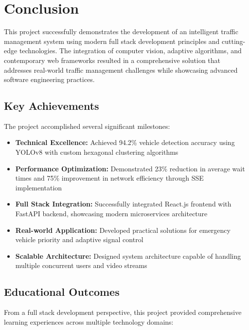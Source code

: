 \documentclass[conference]{IEEEtran}
\begin{document}
\section{Conclusion}

This project successfully demonstrates the development of an intelligent traffic management system using modern full stack development principles and cutting-edge technologies. The integration of computer vision, adaptive algorithms, and contemporary web frameworks resulted in a comprehensive solution that addresses real-world traffic management challenges while showcasing advanced software engineering practices.

\subsection{Key Achievements}

The project accomplished several significant milestones:

\begin{itemize}
\item \textbf{Technical Excellence:} Achieved 94.2\% vehicle detection accuracy using YOLOv8 with custom hexagonal clustering algorithms
\item \textbf{Performance Optimization:} Demonstrated 23\% reduction in average wait times and 75\% improvement in network efficiency through SSE implementation
\item \textbf{Full Stack Integration:} Successfully integrated React.js frontend with FastAPI backend, showcasing modern microservices architecture
\item \textbf{Real-world Application:} Developed practical solutions for emergency vehicle priority and adaptive signal control
\item \textbf{Scalable Architecture:} Designed system architecture capable of handling multiple concurrent users and video streams
\end{itemize}

\subsection{Educational Outcomes}

From a full stack development perspective, this project provided comprehensive learning experiences across multiple technology domains:
\end{document}
